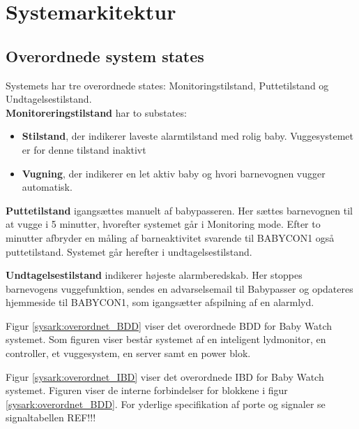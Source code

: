 \chapter{Systemarkitektur}



\section{Overordnede system states}


Systemets har tre overordnede states: Monitoringstilstand, Puttetilstand og Undtagelsestilstand. \\\textbf{Monitoreringstilstand} har to substates: 
\begin{itemize}
	\item \textbf{Stilstand}, der indikerer laveste alarmtilstand med rolig baby. Vuggesystemet er for denne tilstand inaktivt
	\item \textbf{Vugning}, der indikerer en let aktiv baby og hvori barnevognen vugger automatisk.
\end{itemize}

\textbf{Puttetilstand} igangsættes manuelt af babypasseren. Her sættes barnevognen til at vugge i 5 minutter, hvorefter systemet går i Monitoring mode. Efter to minutter afbryder en måling af barneaktivitet svarende til BABYCON1 også puttetilstand. Systemet går herefter i undtagelsestilstand.

\textbf{Undtagelsestilstand} indikerer højeste alarmberedskab. Her stoppes barnevogens vuggefunktion, sendes en advarselsemail til Babypasser og opdateres hjemmeside til BABYCON1, som igangsætter afspilning af en alarmlyd. 

Figur \ref{sysark:overordnet_BDD} viser det overordnede BDD for Baby Watch systemet. Som figuren viser består systemet af en inteligent lydmonitor, en controller, et vuggesystem, en server samt en power blok. 


Figur \ref{sysark:overordnet_IBD} viser det overordnede IBD for Baby Watch systemet.  Figuren viser de interne forbindelser for blokkene i figur \ref{sysark:overordnet_BDD}. For yderlige specifikation af porte og signaler se signaltabellen REF!!!

